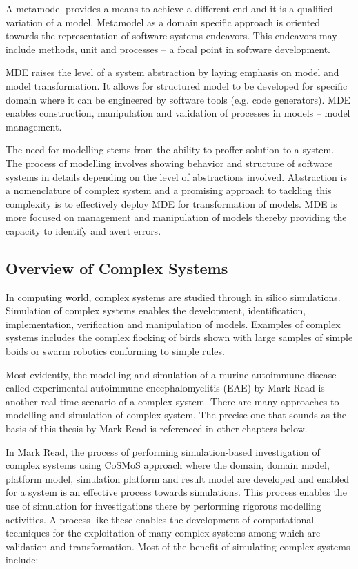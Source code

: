\documentclass[10pt]{article}
\begin{document}
A metamodel provides a means to achieve a different end and it is a qualified variation of a model. Metamodel as a domain specific approach is oriented towards the representation of software systems endeavors. This endeavors may include methods, unit and processes – a focal point in software development.

MDE raises the level of a system abstraction by laying emphasis on model and model transformation. It allows for structured model to be developed for specific domain where it can be engineered by software tools (e.g. code generators). MDE enables construction, manipulation and validation of processes in models – model management.

The need for modelling stems from the ability to proffer solution to a system. The process of modelling involves showing behavior and structure of software systems in details depending on the level of abstractions involved. Abstraction is a nomenclature of complex system and a promising approach to tackling this complexity is to effectively deploy MDE for transformation of models. MDE is more focused on management and manipulation of models thereby providing the capacity to identify and avert errors.

\subsection{Overview of Complex Systems}

In computing world, complex systems are studied through in silico simulations. Simulation of complex systems enables the development, identification, implementation, verification and manipulation of models. Examples of complex systems includes the complex flocking of birds shown with large samples of simple boids or swarm robotics conforming to simple rules. 

Most evidently, the modelling and simulation of a murine autoimmune disease called experimental autoimmune encephalomyelitis (EAE) by Mark Read is another real time scenario of a complex system. There are many approaches to modelling and simulation of complex system. The precise one that sounds as the basis of this thesis by Mark Read is referenced in other chapters below.

In Mark Read, the process of performing simulation-based investigation of complex systems using CoSMoS approach where the domain, domain model, platform model, simulation platform and result model are developed and enabled for a system is an effective process towards simulations. This process enables the use of simulation for investigations there by performing rigorous modelling activities. A process like these enables the development of computational techniques for the exploitation of many complex systems among which are validation and transformation. Most of the benefit of simulating complex systems include:
\end{document}
